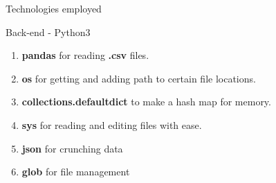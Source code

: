 \documentclass{article}
\begin{document}
\newpage
\begin{centering}
\begin{Huge}
\begin{bf}
\vspace{2.0cm}
\textsf{Technologies employed}\\
\end{bf}
\end{Huge}
\end{centering}
\protect\vspace{2.0cm}
\textbf{}
\huge
Back-end - Python3
\begin{enumerate}
  \item {\bf pandas} for reading {\bf .csv} files.
  \item {\bf os} for getting and adding path to certain file locations.
  \item {\bf collections.defaultdict} to make a hash map for memory.
  \item {\bf sys} for reading and editing files with ease.
  \item {\bf json} for crunching data
  \item {\bf glob} for file management
\end{enumerate}\\
\textbf{}
\end{document}
